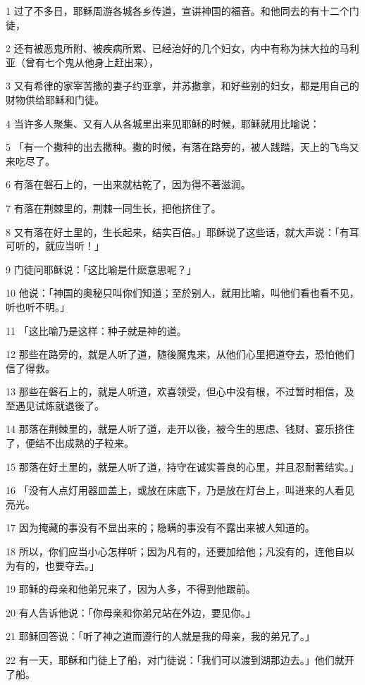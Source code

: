 \par 1 过了不多日，耶稣周游各城各乡传道，宣讲神国的福音。和他同去的有十二个门徒，
\par 2 还有被恶鬼所附、被疾病所累、已经治好的几个妇女，内中有称为抹大拉的马利亚（曾有七个鬼从他身上赶出来），
\par 3 又有希律的家宰苦撒的妻子约亚拿，并苏撒拿，和好些别的妇女，都是用自己的财物供给耶稣和门徒。
\par 4 当许多人聚集、又有人从各城里出来见耶稣的时候，耶稣就用比喻说：
\par 5 「有一个撒种的出去撒种。撒的时候，有落在路旁的，被人践踏，天上的飞鸟又来吃尽了。
\par 6 有落在磐石上的，一出来就枯乾了，因为得不著滋润。
\par 7 有落在荆棘里的，荆棘一同生长，把他挤住了。
\par 8 又有落在好土里的，生长起来，结实百倍。」耶稣说了这些话，就大声说：「有耳可听的，就应当听！」
\par 9 门徒问耶稣说：「这比喻是什麽意思呢？」
\par 10 他说：「神国的奥秘只叫你们知道；至於别人，就用比喻，叫他们看也看不见，听也听不明。」
\par 11 「这比喻乃是这样：种子就是神的道。
\par 12 那些在路旁的，就是人听了道，随後魔鬼来，从他们心里把道夺去，恐怕他们信了得救。
\par 13 那些在磐石上的，就是人听道，欢喜领受，但心中没有根，不过暂时相信，及至遇见试炼就退後了。
\par 14 那落在荆棘里的，就是人听了道，走开以後，被今生的思虑、钱财、宴乐挤住了，便结不出成熟的子粒来。
\par 15 那落在好土里的，就是人听了道，持守在诚实善良的心里，并且忍耐著结实。」
\par 16 「没有人点灯用器皿盖上，或放在床底下，乃是放在灯台上，叫进来的人看见亮光。
\par 17 因为掩藏的事没有不显出来的；隐瞒的事没有不露出来被人知道的。
\par 18 所以，你们应当小心怎样听；因为凡有的，还要加给他；凡没有的，连他自以为有的，也要夺去。」
\par 19 耶稣的母亲和他弟兄来了，因为人多，不得到他跟前。
\par 20 有人告诉他说：「你母亲和你弟兄站在外边，要见你。」
\par 21 耶稣回答说：「听了神之道而遵行的人就是我的母亲，我的弟兄了。」
\par 22 有一天，耶稣和门徒上了船，对门徒说：「我们可以渡到湖那边去。」他们就开了船。
